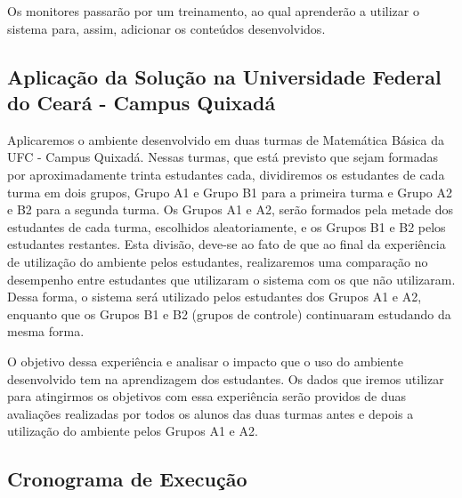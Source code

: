 Os monitores passar\~ao por um treinamento, ao qual aprender\~ao a utilizar o sistema para, assim, adicionar os conteúdos desenvolvidos.

\subsection{Aplicação da Solução na Universidade Federal do Ceará - Campus Quixadá}

Aplicaremos o ambiente desenvolvido em duas turmas de Matemática Básica da UFC - Campus Quixadá. Nessas turmas, que est\'a previsto que sejam formadas por aproximadamente trinta estudantes 
cada, dividiremos os estudantes de cada turma em dois grupos, Grupo A1 e Grupo B1 para a primeira turma e Grupo A2 e B2 para a segunda turma. Os Grupos A1 e A2, ser\~ao formados pela metade 
dos estudantes de cada turma, escolhidos aleatoriamente, e os Grupos B1 e B2 pelos estudantes restantes. 
Esta divisão, deve-se ao fato de que ao final da experiência de utilização do ambiente pelos estudantes, realizaremos uma comparação no desempenho entre estudantes que utilizaram o sistema com os que 
não utilizaram. Dessa forma, o sistema será utilizado pelos estudantes dos Grupos A1 e A2, enquanto que os Grupos B1 e B2 (grupos de controle) continuaram estudando da mesma forma. 

O objetivo dessa experiência e analisar o impacto que o uso do ambiente desenvolvido tem na aprendizagem dos estudantes. Os dados que iremos utilizar para atingirmos os objetivos com essa 
experiência ser\~ao providos de duas avalia\c{c}\~oes realizadas por todos os alunos das duas turmas antes e depois a utiliza\c{c}\~ao do ambiente pelos Grupos A1 e A2.

\subsection{Cronograma de Execução}

